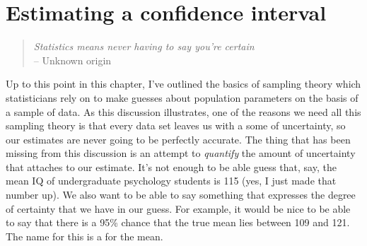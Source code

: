 \section{Estimating a confidence interval\label{sec:ci}}


\begin{quote}
{\it Statistics means never having to say you're certain} \\ \hspace*{2cm} -- Unknown origin
\end{quote}

Up to this point in this chapter, I've outlined the basics of sampling theory which statisticians rely on to make guesses about population parameters on the basis of a sample of data. As this discussion illustrates, one of the reasons we need all this sampling theory is that every data set leaves us with a some of uncertainty, so our estimates are never going to be perfectly accurate. The thing that has been missing from this discussion is an attempt to {\it quantify} the amount of uncertainty that attaches to our estimate. It's not enough to be able guess that, say, the mean IQ of undergraduate psychology students is 115 (yes, I just made that number up). We also want to be able to say something that expresses the degree of certainty that we have in our guess. For example, it would be nice to be able to say that there is a 95\% chance that the true mean lies between 109 and 121. The name for this is a  for the mean.

